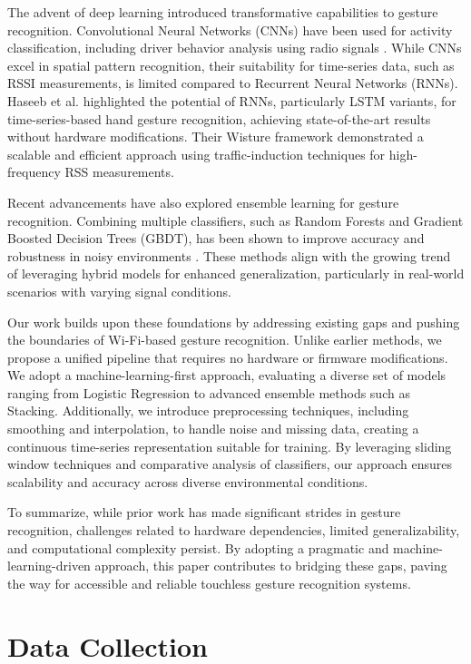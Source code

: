 \documentclass[10pt,twocolumn,letterpaper]{article}
\begin{document}
The advent of deep learning introduced transformative capabilities to gesture recognition. Convolutional Neural Networks (CNNs) have been used for activity classification, including driver behavior analysis using radio signals \cite{wang2017wifi}. While CNNs excel in spatial pattern recognition, their suitability for time-series data, such as RSSI measurements, is limited compared to Recurrent Neural Networks (RNNs). Haseeb et al. \cite{haseeb2020wisture} highlighted the potential of RNNs, particularly LSTM variants, for time-series-based hand gesture recognition, achieving state-of-the-art results without hardware modifications. Their Wisture framework demonstrated a scalable and efficient approach using traffic-induction techniques for high-frequency RSS measurements.

Recent advancements have also explored ensemble learning for gesture recognition. Combining multiple classifiers, such as Random Forests and Gradient Boosted Decision Trees (GBDT), has been shown to improve accuracy and robustness in noisy environments \cite{ensemble_learning}. These methods align with the growing trend of leveraging hybrid models for enhanced generalization, particularly in real-world scenarios with varying signal conditions.

Our work builds upon these foundations by addressing existing gaps and pushing the boundaries of Wi-Fi-based gesture recognition. Unlike earlier methods, we propose a unified pipeline that requires no hardware or firmware modifications. We adopt a machine-learning-first approach, evaluating a diverse set of models ranging from Logistic Regression to advanced ensemble methods such as Stacking. Additionally, we introduce preprocessing techniques, including smoothing and interpolation, to handle noise and missing data, creating a continuous time-series representation suitable for training. By leveraging sliding window techniques and comparative analysis of classifiers, our approach ensures scalability and accuracy across diverse environmental conditions.

To summarize, while prior work has made significant strides in gesture recognition, challenges related to hardware dependencies, limited generalizability, and computational complexity persist. By adopting a pragmatic and machine-learning-driven approach, this paper contributes to bridging these gaps, paving the way for accessible and reliable touchless gesture recognition systems.



\section{Data Collection}
\end{document}
